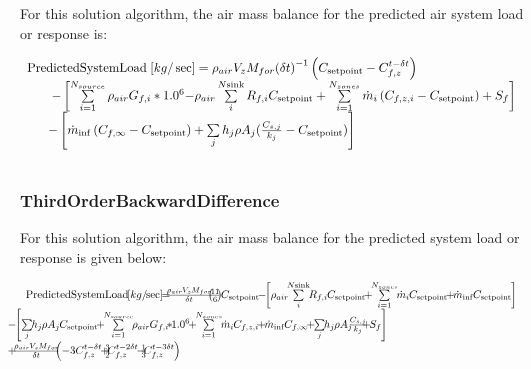 For this solution algorithm, the air mass balance for the predicted air system load or response is:

\begin{equation}
\begin{array}{l}{\rm{PredictedSystemLoad}}\;[kg/\sec ] = {\rho_{air}}{V_z}{M_{for}}{\left( {\delta t} \right)^{ - 1}}\left( {{C_{{\rm{setpoint}}}} - C_{f,z}^{t - \delta t}} \right)\\\;\;\;\;\;\;\; - \left[ {\sum\limits_{i = 1}^{{N_{source}}} {{\rho_{air}}{G_{f,i}}*{{1.0}^6} - } {\rho_{air}}\sum\limits_i^{N{\rm{sink}}} {{R_{f,i}}{C_{{\rm{setpoint}}}}}  + \sum\limits_{i = 1}^{{N_{zones}}} {{{\dot m}_i}} \left( {{C_{f,z,i}} - {C_{{\rm{setpoint}}}}} \right) + {S_f}} \right]\\\;\;\;\;\;\; - \left[ {{{\dot m}_{\inf }}\left( {{C_{f,\infty }} - {C_{{\rm{setpoint}}}}} \right) + \sum\limits_j {{h_j}\rho {A_j}(\frac{{{C_{s,j}}}}{{{k_j}}} - {C_{{\rm{setpoint}}}})} } \right]\;\\\;\;\;\;\;\;\;\;\;\;\;\;\;\;\;\;\end{array}
\end{equation}

\subsubsection{ThirdOrderBackwardDifference}\label{thirdorderbackwarddifference-000}

For this solution algorithm, the air mass balance for the predicted system load or response is given below:

\begin{equation}
\medmuskip=-2mu
\thinmuskip=-2mu
\thickmuskip=-2mu
\nulldelimiterspace=-2pt
\scriptspace=0pt
\begin{array}{l}{\rm{PredictedSystemLoad}}\;[kg/\sec ] = \frac{{{\rho_{air}}{V_z}{M_{for}}}}{{\delta t}}\left( {\frac{{11}}{6}} \right){C_{{\rm{setpoint}}}} - \left[ {{\rho_{air}}\sum\limits_i^{N{\rm{sink}}} {{R_{f,i}}{C_{{\rm{setpoint}}}}}  + \sum\limits_{i = 1}^{{N_{zones}}} {{{\dot m}_i}} {C_{{\rm{setpoint}}}} + {{\dot m}_{\inf }}{C_{{\rm{setpoint}}}}} \right]\\\;\;\;\;\;\;\;\;\;\;\;\;\;\;\; - \left[ {\sum\limits_j {{h_j}\rho {A_j}{C_{{\rm{setpoint}}}}}  + \sum\limits_{i = 1}^{{N_{source}}} {{\rho_{air}}{G_{f,i}}*{{1.0}^6}}  + \sum\limits_{i = 1}^{{N_{zones}}} {{{\dot m}_i}} {C_{f,z,i}} + {{\dot m}_{\inf }}{C_{f,\infty }} + \sum\limits_j {{h_j}\rho {A_j}\frac{{{C_{s,j}}}}{{{k_j}}} + {S_f}} } \right]\\\;\;\;\;\;\;\;\;\;\;\;\;\;\;\; + \frac{{{\rho_{air}}{V_z}{M_{for}}}}{{\delta t}}\left( { - 3C_{f,z}^{t - \delta t} + \frac{3}{2}C_{f,z}^{t - 2\delta t} - \frac{1}{3}C_{f,z}^{t - 3\delta t}} \right)\end{array}
\end{equation}

